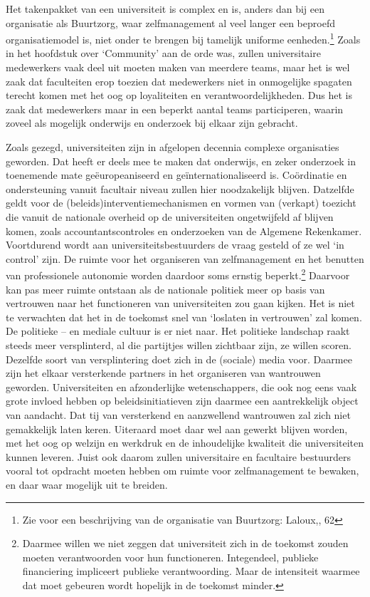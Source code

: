 \documentclass{jote-book}
\begin{document}
	Het takenpakket van een universiteit is complex en is, anders dan bij een organisatie als Buurtzorg, waar zelfmanagement al veel langer een beproefd organisatiemodel is, niet onder te brengen bij tamelijk uniforme eenheden.\footnote{Zie voor een beschrijving van de organisatie van Buurtzorg: Laloux,, 62} Zoals in het hoofdstuk over ‘Community' aan de orde was, zullen universitaire medewerkers vaak deel uit moeten maken van meerdere teams, maar het is wel zaak dat faculteiten erop toezien dat medewerkers niet in onmogelijke spagaten terecht komen met het oog op loyaliteiten en verantwoordelijkheden. Dus het is zaak dat medewerkers maar in een beperkt aantal teams participeren, waarin zoveel als mogelijk onderwijs en onderzoek bij elkaar zijn gebracht.



	Zoals gezegd, universiteiten zijn in afgelopen decennia complexe organisaties geworden. Dat heeft er deels mee te maken dat onderwijs, en zeker onderzoek in toenemende mate geëuropeaniseerd en geïnternationaliseerd is. Coördinatie en ondersteuning vanuit facultair niveau zullen hier noodzakelijk blijven. Datzelfde geldt voor de (beleids)interventiemechanismen en vormen van (verkapt) toezicht die vanuit de nationale overheid op de universiteiten ongetwijfeld af blijven komen, zoals accountantscontroles en onderzoeken van de Algemene Rekenkamer. Voortdurend wordt aan universiteitsbestuurders de vraag gesteld of ze wel ‘in control' zijn. De ruimte voor het organiseren van zelfmanagement en het benutten van professionele autonomie worden daardoor soms ernstig beperkt.\footnote{Daarmee willen we niet zeggen dat universiteit zich in de toekomst zouden moeten verantwoorden voor hun functioneren. Integendeel, publieke financiering impliceert publieke verantwoording. Maar de intensiteit waarmee dat moet gebeuren wordt hopelijk in de toekomst minder.} Daarvoor kan pas meer ruimte ontstaan als de nationale politiek meer op basis van vertrouwen naar het functioneren van universiteiten zou gaan kijken. Het is niet te verwachten dat het in de toekomst snel van ‘loslaten in vertrouwen' zal komen. De politieke -- en mediale cultuur is er niet naar. Het politieke landschap raakt steeds meer versplinterd, al die partijtjes willen zichtbaar zijn, ze willen scoren. Dezelfde soort van versplintering doet zich in de (sociale) media voor. Daarmee zijn het elkaar versterkende partners in het organiseren van wantrouwen geworden. Universiteiten en afzonderlijke wetenschappers, die ook nog eens vaak grote invloed hebben op beleidsinitiatieven zijn daarmee een aantrekkelijk object van aandacht. Dat tij van versterkend en aanzwellend wantrouwen zal zich niet gemakkelijk laten keren. Uiteraard moet daar wel aan gewerkt blijven worden, met het oog op welzijn en werkdruk en de inhoudelijke kwaliteit die universiteiten kunnen leveren. Juist ook daarom zullen universitaire en facultaire bestuurders vooral tot opdracht moeten hebben om ruimte voor zelfmanagement te bewaken, en daar waar mogelijk uit te breiden.
\end{document}
